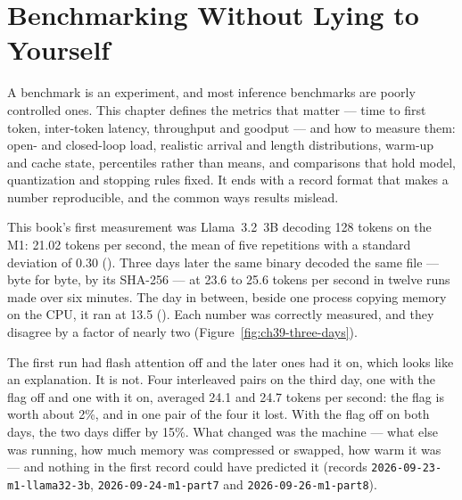 \chapter{Benchmarking Without Lying to Yourself}\label{ch:benchmarking}

\begin{ChapterIntent}
A benchmark is an experiment, and most inference benchmarks are poorly
controlled ones. This chapter defines the metrics that matter --- time to
first token, inter-token latency, throughput and goodput --- and how to
measure them: open- and closed-loop load, realistic arrival and length
distributions, warm-up and cache state, percentiles rather than means, and
comparisons that hold model, quantization and stopping rules fixed. It ends
with a record format that makes a number reproducible, and the common ways
results mislead.
\end{ChapterIntent}


This book's first measurement was Llama~3.2~3B decoding 128 tokens on the M1:
21.02 tokens per second, the mean of five repetitions with a standard deviation
of 0.30 (). Three days later the same binary decoded the
same file --- byte for byte, by its SHA-256 --- at 23.6 to 25.6 tokens per
second in twelve runs made over six minutes. The day in between, beside one
process copying memory on the CPU, it ran at 13.5 ().
Each number was correctly measured, and they disagree by a factor of nearly two
(Figure~\ref{fig:ch39-three-days}).

The first run had flash attention off and the later ones had it on, which looks
like an explanation. It is not. Four interleaved pairs on the third day, one
with the flag off and one with it on, averaged 24.1 and 24.7 tokens per second:
the flag is worth about 2\%, and in one pair of the four it lost. With the flag
off on both days, the two days differ by 15\%. What changed was the machine
--- what else was running, how much memory was compressed or swapped, how warm
it was --- and nothing in the first record could have predicted it (records
\texttt{2026-09-23-m1-llama32-3b}, \texttt{2026-09-24-m1-part7} and
\texttt{2026-09-26-m1-part8}).

